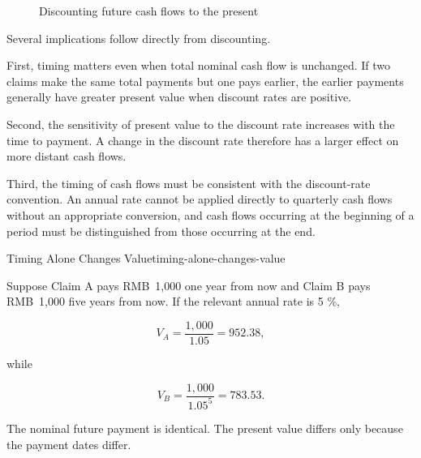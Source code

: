 \begin{figure}[H]
\centering
{}

\caption{Discounting future cash flows to the present}
\label{fig:ch5-discount-timeline}
\end{figure}

Several implications follow directly from discounting.

First, timing matters even when total nominal cash flow is unchanged. If two claims make the same total payments but one pays earlier, the earlier payments generally have greater present value when discount rates are positive.

Second, the sensitivity of present value to the discount rate increases with the time to payment. A change in the discount rate therefore has a larger effect on more distant cash flows.

Third, the timing of cash flows must be consistent with the discount-rate convention. An annual rate cannot be applied directly to quarterly cash flows without an appropriate conversion, and cash flows occurring at the beginning of a period must be distinguished from those occurring at the end.

\begin{example}{Timing Alone Changes Value}{timing-alone-changes-value}

Suppose Claim A pays RMB~1,000 one year from now and Claim B pays RMB~1,000 five years from now. If the relevant annual rate is 5 \%,

\[
V_A=\frac{1,000}{1.05}=952.38,
\]

while

\[
V_B=\frac{1,000}{1.05^5}=783.53.
\]

The nominal future payment is identical. The present value differs only because the payment dates differ.

\end{example}


